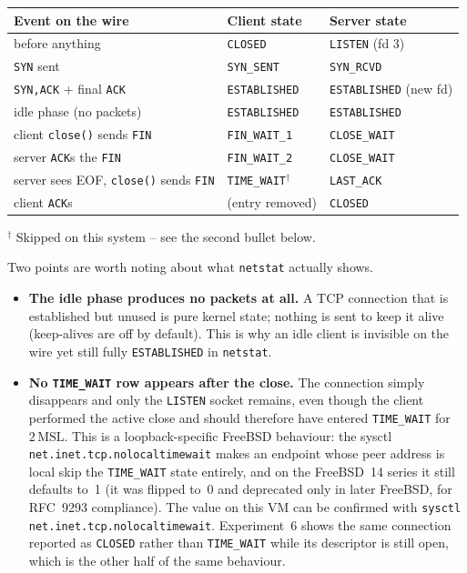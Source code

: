 \documentclass[11pt,a4paper]{article}
\begin{document}
\begin{center}
\small
\begin{tabular}{@{}lll@{}}
\toprule
\textbf{Event on the wire} & \textbf{Client state} & \textbf{Server state} \\
\midrule
before anything                & \texttt{CLOSED}      & \texttt{LISTEN} (fd 3) \\
\texttt{SYN} sent              & \texttt{SYN\_SENT}   & \texttt{SYN\_RCVD} \\
\texttt{SYN,ACK} + final \texttt{ACK} & \texttt{ESTABLISHED} & \texttt{ESTABLISHED} (new fd) \\
idle phase (no packets)        & \texttt{ESTABLISHED} & \texttt{ESTABLISHED} \\
client \texttt{close()} sends \texttt{FIN} & \texttt{FIN\_WAIT\_1} & \texttt{CLOSE\_WAIT} \\
server \texttt{ACK}s the \texttt{FIN}      & \texttt{FIN\_WAIT\_2} & \texttt{CLOSE\_WAIT} \\
server sees EOF, \texttt{close()} sends \texttt{FIN} & \texttt{TIME\_WAIT}$^\dagger$ & \texttt{LAST\_ACK} \\
client \texttt{ACK}s          & (entry removed)      & \texttt{CLOSED} \\
\bottomrule
\end{tabular}

\smallskip
{\footnotesize $^\dagger$ Skipped on this system -- see the second bullet below.}
\end{center}

Two points are worth noting about what \texttt{netstat} actually shows.

\begin{itemize}[leftmargin=1.4em,itemsep=2pt]
\item \textbf{The idle phase produces no packets at all.}  A TCP connection that is
      established but unused is pure kernel state; nothing is sent to keep it alive
      (keep-alives are off by default).  This is why an idle client is invisible on the
      wire yet still fully \texttt{ESTABLISHED} in \texttt{netstat}.
\item \textbf{No \texttt{TIME\_WAIT} row appears after the close.}  The connection
      simply disappears and only the \texttt{LISTEN} socket remains, even though the
      client performed the active close and should therefore have entered
      \texttt{TIME\_WAIT} for $2\,\text{MSL}$.  This is a loopback-specific FreeBSD
      behaviour: the sysctl \texttt{net.inet.tcp.nolocaltimewait} makes an endpoint
      whose peer address is local skip the \texttt{TIME\_WAIT} state entirely, and on
      the FreeBSD~14 series it still defaults to~1 (it was flipped to~0 and deprecated
      only in later FreeBSD, for RFC~9293 compliance).  The value on this VM can be
      confirmed with \texttt{sysctl net.inet.tcp.nolocaltimewait}.  Experiment~6
      shows the same connection reported as \texttt{CLOSED} rather than
      \texttt{TIME\_WAIT} while its descriptor is still open, which is the other half of
      the same behaviour.
\end{itemize}
\end{document}
